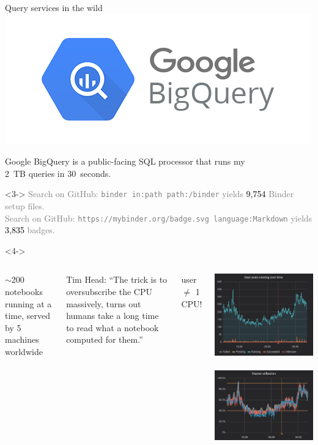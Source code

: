 \documentclass[aspectratio=169]{beamer}
\begin{document}
\begin{frame}{Query services in the wild}
\hfill \includegraphics[height=1.5 cm]{google-bigquery-logo.png}

\vspace{-1.25 cm}
Google BigQuery is a public-facing SQL processor that runs my \\ 2~TB queries in 30~seconds.

\vspace{0.5 cm}
\hfill {}

\vspace{-1.1 cm}

\vspace{0.25 cm}
\begin{uncoverenv}<3->
\textcolor{gray}{\small
Search on GitHub: {\tt\scriptsize binder in:path path:/binder} yields \textcolor{black}{9,754} Binder setup files. \\
Search on GitHub: {\tt\scriptsize https://mybinder.org/badge.svg language:Markdown} yields \textcolor{black}{3,835} badges.}
\end{uncoverenv}

\begin{uncoverenv}<4->
\begin{columns}
\small
$\sim$200 notebooks running at a time, served by 5 machines worldwide

\vspace{0.25 cm}
\scriptsize Tim Head: ``The trick is to oversubscribe the CPU massively, turns out humans take a long time to read what a notebook computed for them.''

\normalsize
\vspace{0.25 cm}
 user $\neq$ 1 CPU!

\includegraphics[height=3 cm]{binder-notebooks-running.png}\mbox{ }\includegraphics[height=3 cm]{binder-utilization.png}
\end{columns}
\end{uncoverenv}
\end{frame}
\end{document}
